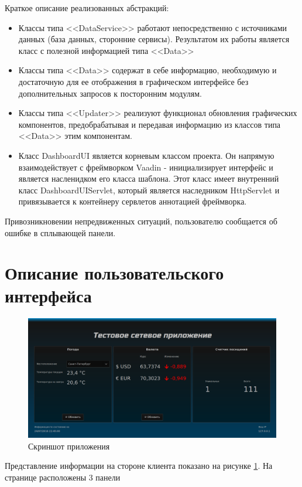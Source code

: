 \documentclass{article}
\begin{document}
Краткое описание реализованных абстракций:
\begin{itemize}
\item Классы типа <<DataService>> работают непосредственно с источниками данных (база данных, сторонние сервисы). Результатом их работы является класс с полезной информацией типа <<Data>>
\item Классы типа <<Data>> содержат в себе информацию, необходимую и достаточную для ее отображения в графическом интерфейсе без дополнительных запросов к посторонним модулям.
\item Классы типа <<Updater>> реализуют функционал обновления графических компонентов, предобрабатывая и передавая информацию из классов типа <<Data>> этим компонентам.
\item Класс DashboardUI является корневым классом проекта. Он напрямую взаимодействует с фреймворком Vaadin - инициализирует интерфейс и является насленидком его класса шаблона. Этот класс имеет внутренний класс DashboardUIServlet, который является 
наследником HttpServlet и привязывается к контейнеру сервлетов аннотацией фреймворка.
\end{itemize}

Привозникновении непредвиженных ситуаций, пользователю сообщается 
об ошибке в сплывающей панели.

\section{Описание пользовательского интерфейса}
\doublespacing

\begin{figure}[h]
\centering
\includegraphics[width=\textwidth]{screenshot}
\caption{Скриншот приложения}
\label{fig:screen1}
\end{figure}

Представление информации на стороне клиента показано на рисунке \ref{fig:screen1}.
На странице расположены 3 панели
\end{document}
